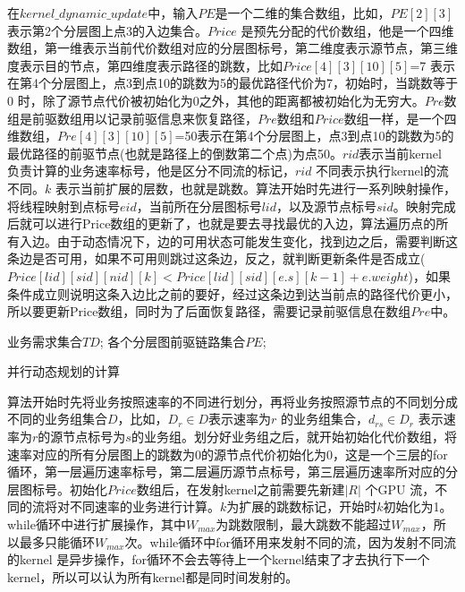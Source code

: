 在$kernel\_dynamic\_update$中，输入$PE$是一个二维的集合数组，比如，$PE[2][3]$表示第2个分层图上点3的入边集合。$Price$ 是预先分配的代价数组，他是一个四维数组，第一维表示当前代价数组对应的分层图标号，第二维度表示源节点，第三维度表示目的节点，第四维度表示路径的跳数，比如$Price[4][3][10][5]$=7 表示在第4个分层图上，点3到点10的跳数为5的最优路径代价为7，初始时，当跳数等于0 时，除了源节点代价被初始化为0之外，其他的距离都被初始化为无穷大。$Pre$数组是前驱数组用以记录前驱信息来恢复路径，$Pre$数组和$Price$数组一样，是一个四维数组，$Pre[4][3][10][5]$=50表示在第4个分层图上，点3到点10的跳数为5的最优路径的前驱节点(也就是路径上的倒数第二个点)为点50。$rid$表示当前kernel 负责计算的业务速率标号，他是区分不同流的标记，$rid$ 不同表示执行kernel的流不同。$k$ 表示当前扩展的层数，也就是跳数。算法开始时先进行一系列映射操作，将线程映射到点标号$eid$，当前所在分层图标号$lid$，以及源节点标号$sid$。映射完成后就可以进行Price数组的更新了，也就是要去寻找最优的入边，算法遍历点的所有入边。由于动态情况下，边的可用状态可能发生变化，找到边之后，需要判断这条边是否可用，如果不可用则跳过这条边，反之，就判断更新条件是否成立($Price[lid][sid][nid][k]<Price[lid][sid][e.s][k-1]+e.weight$)，如果条件成立则说明这条入边比之前的要好，经过这条边到达当前点的路径代价更小，所以要更新Price数组，同时为了后面恢复路径，需要记录前驱信息在数组$Pre$中。
\begin{algorithm}[t]
\begin{algorithmic}[1]
\Require
业务需求集合$TD$;
各个分层图前驱链路集合$PE$;
\Else
{}
\EndIf
{}
\EndFor
\EndFor
\EndFor
\EndFor
{}
\EndFor
{}
\EndWhile
{}
\end{algorithmic}
\caption{{并行动态规划的计算}}
\label{ParaSPC}
\end{algorithm}

算法开始时先将业务按照速率的不同进行划分，再将业务按照源节点的不同划分成不同的业务组集合$D$，比如，$D_r \in D$表示速率为$r$ 的业务组集合，$d_{rs} \in D_r$ 表示速率为$r$的源节点标号为$s$的业务组。划分好业务组之后，就开始初始化代价数组，将速率对应的所有分层图上的跳数为0的源节点代价初始化为0，这是一个三层的for循环，第一层遍历速率标号，第二层遍历源节点标号，第三层遍历速率所对应的分层图标号。初始化$Price$数组后，在发射kernel之前需要先新建$|R|$ 个GPU 流，不同的流将对不同速率的业务进行计算。$k$为扩展的跳数标记，开始时$k$初始化为1。while循环中进行扩展操作，其中$W_{max}$为跳数限制，最大跳数不能超过$W_{max}$，所以最多只能循环$W_{max}$次。while循环中for循环用来发射不同的流，因为发射不同流的kernel 是异步操作，for循环不会去等待上一个kernel结束了才去执行下一个kernel，所以可以认为所有kernel都是同时间发射的。
